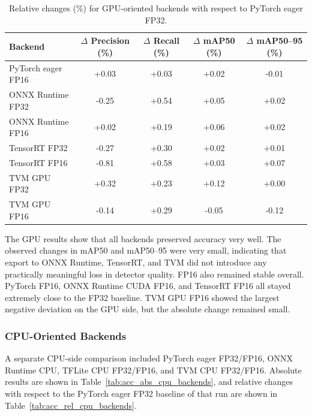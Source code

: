 \documentclass[12pt,a4paper]{report}
\begin{document}
\begin{table}[ht]
\centering
\caption{Relative changes (\%) for GPU-oriented backends with respect to PyTorch eager FP32.}
\label{tab:acc_rel_gpu_backends}
\begin{tabular}{lcccc}
\toprule
Backend & $\Delta$ Precision (\%) & $\Delta$ Recall (\%) & $\Delta$ mAP50 (\%) & $\Delta$ mAP50--95 (\%) \\
\midrule
PyTorch eager FP16     & +0.03 & +0.03 & +0.02 & -0.01 \\
ONNX Runtime FP32 & -0.25 & +0.54 & +0.05 & +0.02 \\
ONNX Runtime FP16 & +0.02 & +0.19 & +0.06 & +0.02 \\
TensorRT FP32          & -0.27 & +0.30 & +0.02 & +0.01 \\
TensorRT FP16          & -0.81 & +0.58 & +0.03 & +0.07 \\
TVM GPU FP32           & +0.32 & +0.23 & +0.12 & +0.00 \\
TVM GPU FP16           & -0.14 & +0.29 & -0.05 & -0.12 \\
\bottomrule
\end{tabular}
\end{table}

The GPU results show that all backends preserved accuracy very well. The observed changes in mAP50 and mAP50--95 were
very small, indicating that export to ONNX Runtime, TensorRT, and TVM did not introduce any practically meaningful
loss in detector quality. FP16 also remained stable overall. PyTorch FP16, ONNX Runtime CUDA FP16, and TensorRT FP16
all stayed extremely close to the FP32 baseline. TVM GPU FP16 showed the largest negative deviation on the GPU side,
but the absolute change remained small.

\subsubsection{CPU-Oriented Backends}

A separate CPU-side comparison included PyTorch eager FP32/FP16, ONNX Runtime CPU, TFLite CPU FP32/FP16, and
TVM CPU FP32/FP16. Absolute results are shown in Table~\ref{tab:acc_abs_cpu_backends}, and relative changes with
respect to the PyTorch eager FP32 baseline of that run are shown in Table~\ref{tab:acc_rel_cpu_backends}.
\end{document}
